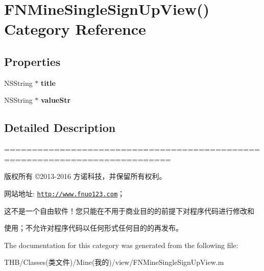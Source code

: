 \hypertarget{category_f_n_mine_single_sign_up_view_07_08}{}\section{F\+N\+Mine\+Single\+Sign\+Up\+View() Category Reference}
\label{category_f_n_mine_single_sign_up_view_07_08}
\subsection*{Properties}
\begin{DoxyCompactItemize}
\item 
\mbox{\label{category_f_n_mine_single_sign_up_view_07_08_aa941b97ad272a955728b39bffac22f4c}} 
N\+S\+String $\ast$ {\bfseries title}
\item 
\mbox{\label{category_f_n_mine_single_sign_up_view_07_08_a2002d87d285d29823150a07dea46d287}} 
N\+S\+String $\ast$ {\bfseries value\+Str}
\end{DoxyCompactItemize}


\subsection{Detailed Description}
============================================================================

版权所有 ©2013-\/2016 方诺科技，并保留所有权利。

网站地址\+: \href{http://www.fnuo123.com}{\tt http\+://www.\+fnuo123.\+com}； 



这不是一个自由软件！您只能在不用于商业目的的前提下对程序代码进行修改和

使用；不允许对程序代码以任何形式任何目的的再发布。 

 

The documentation for this category was generated from the following file\+:\begin{DoxyCompactItemize}
\item 
T\+H\+B/\+Classes(类文件)/\+Mine(我的)/view/F\+N\+Mine\+Single\+Sign\+Up\+View.\+m\end{DoxyCompactItemize}
